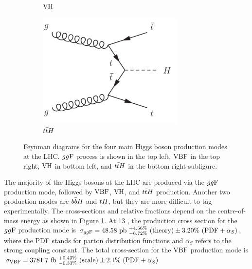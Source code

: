 \begin{figure}[h]
\begin{subfigure}[b]{0.5\textwidth}
    \caption{$\text{VH}$}
  \end{subfigure}%
  \begin{subfigure}[b]{0.5\textwidth}
    \centering
    \includegraphics[width=0.8\textwidth]{figures/theory/ttH}
    \caption{$t\bar{t} H$}
  \end{subfigure}
  \caption[Feynman diagrams for the four main Higgs boson production modes at the LHC.]
  {Feynman diagrams for the four main Higgs boson production modes at the LHC.
  $gg\text{F}$ process is shown in the top left, $\text{VBF}$ in the top right, $\text{VH}$ in bottom left, and
  $t\bar{t} H$ in the bottom right subfigure.}
   \label{fig:the:prod}
\end{figure}

The majority of the Higgs bosons at the LHC are produced via the $gg\text{F}$ production mode,
followed by $\text{VBF}$, $\text{VH}$, and $t\bar{t} H$ production. Another two production modes are $b\bar{b} H$
and $tH$, but they are more difficult to tag experimentally. The cross-sections and
relative fractions depend on the centre-of-mass energy as shown in Figure \ref{fig:the:prod}.
At 13 \TeV, the production cross section for the $gg\text{F}$ production mode is
$\sigma_{gg\text{F}} = 48.58~\text{pb}
~^{+4.56\%}_{-6.72\%}~(\text{theory})
\pm 3.20\%~(\text{PDF}+\alpha_S)$,
where the PDF stands for parton distribution functions and $\alpha_S$ refers to the strong
coupling constant. The total cross-section for the $\text{VBF}$ production mode is
$\sigma_{\text{VBF}} = 3781.7~\text{fb}
~^{+0.43\%}_{-0.33\%}~(\text{scale})
\pm 2.1\%~(\text{PDF}+\alpha_S) $

